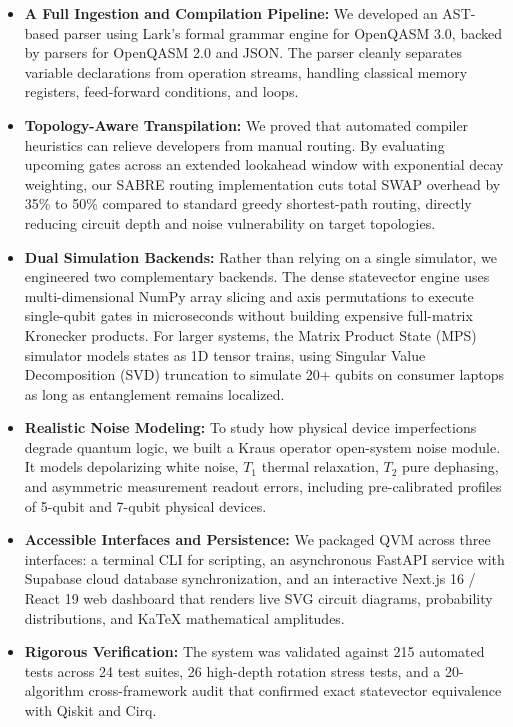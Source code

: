 \begin{itemize}[leftmargin=*]
    \item \textbf{A Full Ingestion and Compilation Pipeline:} We developed an AST-based parser using Lark's formal grammar engine for OpenQASM 3.0, backed by parsers for OpenQASM 2.0 and JSON. The parser cleanly separates variable declarations from operation streams, handling classical memory registers, feed-forward conditions, and loops.
    \item \textbf{Topology-Aware Transpilation:} We proved that automated compiler heuristics can relieve developers from manual routing. By evaluating upcoming gates across an extended lookahead window with exponential decay weighting, our SABRE routing implementation cuts total SWAP overhead by 35\% to 50\% compared to standard greedy shortest-path routing, directly reducing circuit depth and noise vulnerability on target topologies.
    \item \textbf{Dual Simulation Backends:} Rather than relying on a single simulator, we engineered two complementary backends. The dense statevector engine uses multi-dimensional NumPy array slicing and axis permutations to execute single-qubit gates in microseconds without building expensive full-matrix Kronecker products. For larger systems, the Matrix Product State (MPS) simulator models states as 1D tensor trains, using Singular Value Decomposition (SVD) truncation to simulate 20+ qubits on consumer laptops as long as entanglement remains localized.
    \item \textbf{Realistic Noise Modeling:} To study how physical device imperfections degrade quantum logic, we built a Kraus operator open-system noise module. It models depolarizing white noise, $T_1$ thermal relaxation, $T_2$ pure dephasing, and asymmetric measurement readout errors, including pre-calibrated profiles of 5-qubit and 7-qubit physical devices.
    \item \textbf{Accessible Interfaces and Persistence:} We packaged QVM across three interfaces: a terminal CLI for scripting, an asynchronous FastAPI service with Supabase cloud database synchronization, and an interactive Next.js 16 / React 19 web dashboard that renders live SVG circuit diagrams, probability distributions, and KaTeX mathematical amplitudes.
    \item \textbf{Rigorous Verification:} The system was validated against 215 automated tests across 24 test suites, 26 high-depth rotation stress tests, and a 20-algorithm cross-framework audit that confirmed exact statevector equivalence with Qiskit and Cirq.
\end{itemize}

